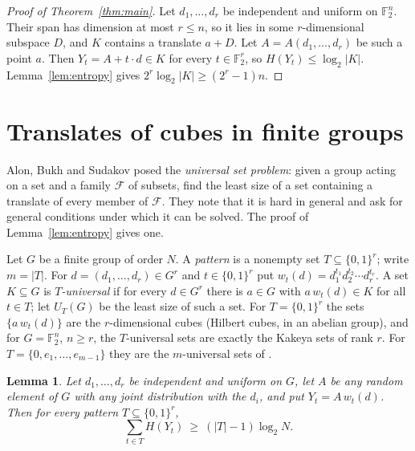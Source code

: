 \documentclass[11pt]{amsart}
\newtheorem{lemma}[theorem]{Lemma}
\theoremstyle{remark}
\newcommand{\F}{\mathbb{F}}
\begin{document}
\begin{proof}[Proof of Theorem~\ref{thm:main}]
Let $d_1,\dots,d_r$ be independent and uniform on $\F_2^n$. Their span has dimension at most
$r\le n$, so it lies in some $r$-dimensional subspace $D$, and $K$ contains a translate $a+D$. Let
$A=A(d_1,\dots,d_r)$ be such a point $a$. Then $Y_t=A+t\cdot d\in K$ for every $t\in\F_2^r$, so
$H(Y_t)\le\log_2|K|$. Lemma~\ref{lem:entropy} gives $2^r\log_2|K|\ge(2^r-1)n$.
\end{proof}

\section{Translates of cubes in finite groups}\label{sec:groups}

Alon, Bukh and Sudakov \cite{ABS} posed the \emph{universal set problem}: given a group acting on
a set and a family $\mathcal F$ of subsets, find the least size of a set containing a translate of
every member of $\mathcal F$. They note that it is hard in general and ask for general conditions
under which it can be solved. The proof of Lemma~\ref{lem:entropy} gives one.

Let $G$ be a finite group of order $N$. A \emph{pattern} is a nonempty set $T\subseteq\{0,1\}^r$;
write $m=|T|$. For $d=(d_1,\dots,d_r)\in G^r$ and $t\in\{0,1\}^r$ put
$w_t(d)=d_1^{t_1}d_2^{t_2}\cdots d_r^{t_r}$. A set $K\subseteq G$ is \emph{$T$-universal} if for
every $d\in G^r$ there is $a\in G$ with $a\,w_t(d)\in K$ for all $t\in T$; let $U_T(G)$ be the least
size of such a set. For $T=\{0,1\}^r$ the sets $\{a\,w_t(d)\}$ are the $r$-dimensional cubes
(Hilbert cubes, in an abelian group), and for $G=\F_2^n$, $n\ge r$, the $T$-universal sets are
exactly the Kakeya sets of rank $r$. For $T=\{0,e_1,\dots,e_{m-1}\}$ they are the $m$-universal
sets of \cite{ABS}.

\begin{lemma}\label{lem:groups}
Let $d_1,\dots,d_r$ be independent and uniform on $G$, let $A$ be any random element of $G$ with
any joint distribution with the $d_i$, and put $Y_t=A\,w_t(d)$. Then for every pattern
$T\subseteq\{0,1\}^r$,
\[
  \sum_{t\in T}H(Y_t)\ \ge\ (|T|-1)\log_2N.
\]
\end{lemma}
\end{document}
